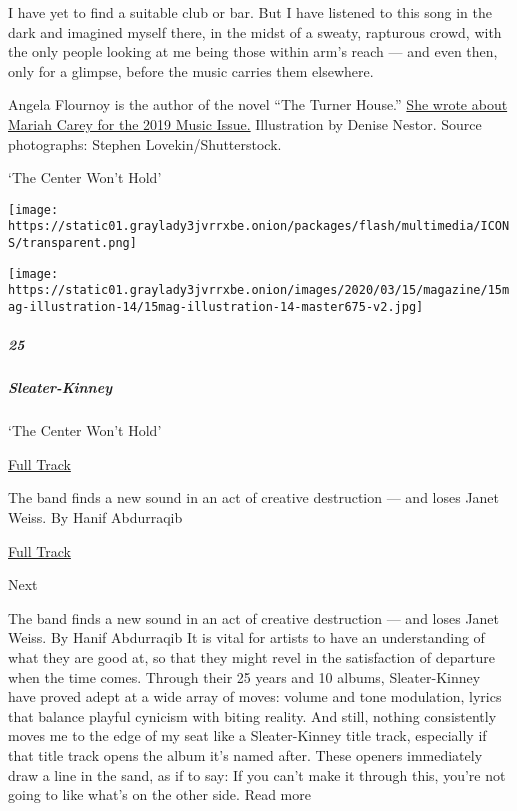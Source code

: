 I have yet to find a suitable club or bar. But I have listened to this
song in the dark and imagined myself there, in the midst of a sweaty,
rapturous crowd, with the only people looking at me being those within
arm's reach --- and even then, only for a glimpse, before the music
carries them elsewhere.

Angela Flournoy is the author of the novel ``The Turner House.''
\href{https://www.nytimes3xbfgragh.onion/interactive/2019/03/07/magazine/top-songs.html\#/mariah-carey}{She
wrote about Mariah Carey for the 2019 Music Issue.} Illustration by
Denise Nestor. Source photographs: Stephen Lovekin/Shutterstock.

`The Center Won't Hold'

\texttt{[image: https://static01.graylady3jvrrxbe.onion/packages/flash/multimedia/ICONS/transparent.png]}

\texttt{[image: https://static01.graylady3jvrrxbe.onion/images/2020/03/15/magazine/15mag-illustration-14/15mag-illustration-14-master675-v2.jpg]}

\hypertarget{25-1}{%
\subparagraph{25}\label{25-1}}

\hypertarget{sleater-kinney}{%
\subparagraph{Sleater-Kinney}\label{sleater-kinney}}

`The Center Won't Hold'

\href{https://open.spotify.com/track/0SJZFV7p1Nhd9xQnUonHSY?si=2iap8ASQRuS5DQPOtEAaOw}{
Full Track}

The band finds a new sound in an act of creative destruction --- and
loses Janet Weiss. By Hanif Abdurraqib

\href{https://open.spotify.com/track/0SJZFV7p1Nhd9xQnUonHSY?si=2iap8ASQRuS5DQPOtEAaOw}{Full
Track }

Next

The band finds a new sound in an act of creative destruction --- and
loses Janet Weiss. By Hanif Abdurraqib It is vital for artists to have
an understanding of what they are good at, so that they might revel in
the satisfaction of departure when the time comes. Through their 25
years and 10 albums, Sleater-Kinney have proved adept at a wide array of
moves: volume and tone modulation, lyrics that balance playful cynicism
with biting reality. And still, nothing consistently moves me to the
edge of my seat like a Sleater-Kinney title track, especially if that
title track opens the album it's named after. These openers immediately
draw a line in the sand, as if to say: If you can't make it through
this, you're not going to like what's on the other side. Read more


